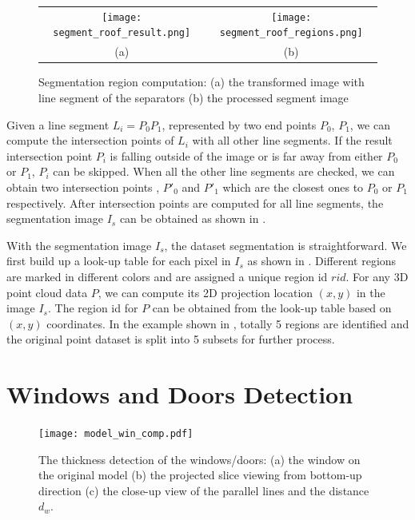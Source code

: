 \begin{figure} [htbp]
\begin{center}
\begin{tabular}{cc}
\texttt{[image: segment\_roof\_result.png]} &
\texttt{[image: segment\_roof\_regions.png]} \\
(a) & (b) 
\end{tabular}
\end{center}
\caption{ Segmentation region computation:
      (a) the transformed image with line segment of the separators
      (b) the processed segment image}
\label{fig:DS_Fig1}
\end{figure}

Given a line segment $L_i = P_0P_1$, represented by two end points $P_0$, $P_1$, 
we can compute the intersection points of
$L_i$ with all other line segments. %
If the result intersection point $P_i$ is falling outside of the image or 
is far away from either $P_0$ or $P_1$, $P_i$ can be skipped. 
When all the other line segments are checked, we can obtain two intersection points
, $P'_0$ and $P'_1$ which are the closest ones to $P_0$ or $P_1$ respectively. 
After intersection points are computed for all line segments, 
the segmentation image $I_s$ can be obtained as shown in .

With the segmentation image $I_s$, the dataset segmentation is straightforward. 
We first build up a look-up table for each pixel in $I_s$ as shown in . 
Different regions are marked in different colors and are assigned a unique region id $rid$. 
For any 3D point cloud data $P$, we can compute
its 2D projection location $(x, y)$ in the image $I_s$. %
The region id for $P$ can be obtained from the look-up table based on $(x, y)$ coordinates.
In the example shown in , 
totally 5 regions are identified and the original point dataset is split into 5 subsets for further process.

\section{Windows and Doors Detection}
\label{sec:wdd}

\begin{figure}[htbp]
  \centering
  \texttt{[image: model\_win\_comp.pdf]}
      \caption{The thickness detection of the windows/doors:
      (a) the window on the original model
      (b) the projected slice viewing from bottom-up direction
      (c) the close-up view of the parallel lines and the distance $d_w$. }
      \label{fig:WD_Fig1}
\end{figure}

